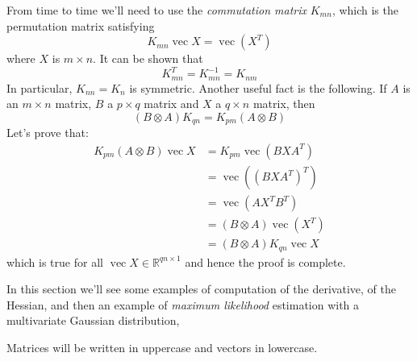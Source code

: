 \documentclass[a4paper,12pt]{article}
\begin{document}
From time to time we'll need to use the \emph{commutation matrix} $K_{mn}$, which is the permutation matrix satisfying
$$ K_{mn}\operatorname{vec}X = \operatorname{vec}(X^T)
$$ where $X$ is $m\times n$. It can be shown that
$$ K_{mn}^T = K_{mn}^{-1} = K_{nm}
$$ In particular, $K_{nn} = K_n$ is symmetric. Another useful fact is the following. If $A$ is an $m\times n$ matrix, $B$ a $p\times q$ matrix and $X$ a $q\times n$ matrix, then
$$ (B\otimes A)K_{qn} = K_{pm}(A\otimes B)
$$ Let's prove that:
$$
\begin{align}
K_{pm}(A\otimes B)\operatorname{vec}X
  &= K_{pm}\operatorname{vec}(BXA^T) \\
  &= \operatorname{vec}((BXA^T)^T) \\
  &= \operatorname{vec}(AX^TB^T) \\
  &= (B\otimes A)\operatorname{vec}(X^T) \\
  &= (B\otimes A)K_{qn}\operatorname{vec}X
\end{align}
$$ which is true for all $\operatorname{vec}X\in\mathbb{R}^{qn\times 1}$ and hence the proof is complete.

In this section we'll see some examples of computation of the derivative, of the Hessian, and then an example of \emph{maximum likelihood} estimation with a multivariate Gaussian distribution,

Matrices will be written in uppercase and vectors in lowercase.
\end{document}
